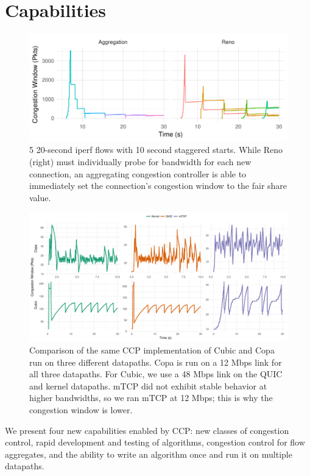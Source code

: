 \section{Capabilities}
\label{s:capabilities}

\begin{figure}
    \centering
    \includegraphics[width=\columnwidth]{img/stair}
    \caption{5 20-second iperf flows with 10 second staggered starts. While Reno (right) must individually probe for bandwidth for each new connection, an aggregating congestion controller is able to immediately set the connection's congestion window to the fair share value.}
    \label{fig:cap:agg}
\end{figure}
\begin{figure}[t!]
    \centering
    \includegraphics[width=2\columnwidth]{img/new-wora}
    \caption{Comparison of the same CCP implementation of Cubic and Copa run on three different datapaths. Copa is run on a 12 Mbps link for all three datapaths. For Cubic, we use a 48 Mbps link on the QUIC and kernel datapaths. mTCP did not exhibit stable behavior at higher bandwidths, so we ran mTCP at 12 Mbps; this is why the congestion window is lower.}\label{fig:datapaths:wora}
\end{figure}

We present four new capabilities enabled by CCP: new classes of congestion control, rapid development and testing of algorithms, congestion control for flow aggregates, and the ability to write an algorithm once and run it on multiple datapaths.

